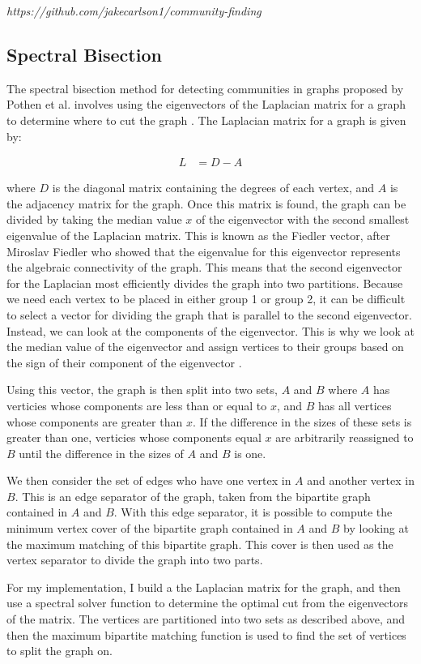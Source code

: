 \documentclass{article}
\begin{document}
\textit{https://github.com/jakecarlson1/community-finding}

    \subsection{Spectral Bisection}
    The spectral bisection method for detecting communities in graphs proposed by Pothen et al. involves using the eigenvectors of the Laplacian matrix for a graph to determine where to cut the graph \cite{doi:10.1137/0611030}. The Laplacian matrix for a graph is given by:

    \begin{align}
        L &= D - A
    \end{align}

    where $D$ is the diagonal matrix containing the degrees of each vertex, and $A$ is the adjacency matrix for the graph. Once this matrix is found, the graph can be divided by taking the median value $x$ of the eigenvector with the second smallest eigenvalue of the Laplacian matrix. This is known as the Fiedler vector, after Miroslav Fiedler who showed that the eigenvalue for this eigenvector represents the algebraic connectivity of the graph. This means that the second eigenvector for the Laplacian most efficiently divides the graph into two partitions. Because we need each vertex to be placed in either group 1 or group 2, it can be difficult to select a vector for dividing the graph that is parallel to the second eigenvector. Instead, we can look at the components of the eigenvector. This is why we look at the median value of the eigenvector and assign vertices to their groups based on the sign of their component of the eigenvector \cite{Newman2006.2}.
    \par
    Using this vector, the graph is then split into two sets, $A$ and $B$ where $A$ has verticies whose components are less than or equal to $x$, and $B$ has all vertices whose components are greater than $x$. If the difference in the sizes of these sets is greater than one, verticies whose components equal $x$ are arbitrarily reassigned to $B$ until the difference in the sizes of $A$ and $B$ is one.
    \par
    We then consider the set of edges who have one vertex in $A$ and another vertex in $B$. This is an edge separator of the graph, taken from the bipartite graph contained in $A$ and $B$. With this edge separator, it is possible to compute the minimum vertex cover of the bipartite graph contained in $A$ and $B$ by looking at the maximum matching of this bipartite graph. This cover is then used as the vertex separator to divide the graph into two parts.
    \par
    For my implementation, I build a the Laplacian matrix for the graph, and then use a spectral solver function to determine the optimal cut from the eigenvectors of the matrix. The vertices are partitioned into two sets as described above, and then the maximum bipartite matching function is used to find the set of vertices to split the graph on.
\end{document}
